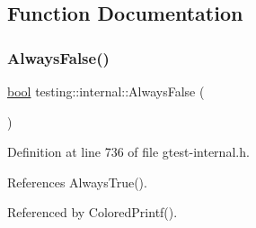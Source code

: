 \subsection{Function Documentation}
\mbox{\label{namespacetesting_1_1internal_a4b24c851ab13569b1b15b3d259b60d2e}} 
\subsubsection{\texorpdfstring{Always\+False()}{AlwaysFalse()}}
{\footnotesize\ttfamily \hyperlink{classbool}{bool} testing\+::internal\+::\+Always\+False (\begin{DoxyParamCaption}{ }\end{DoxyParamCaption})\hspace{0.3cm}{\ttfamily [inline]}}



Definition at line 736 of file gtest-\/internal.\+h.



References Always\+True().



Referenced by Colored\+Printf().



